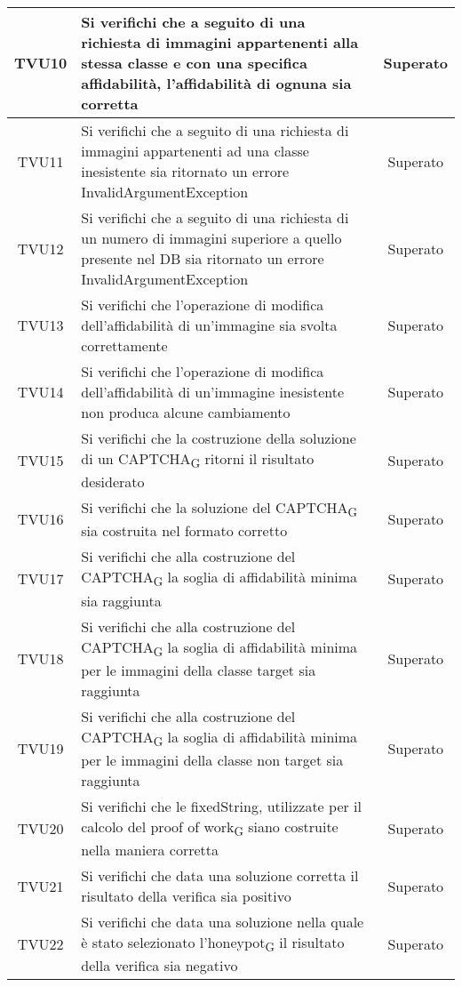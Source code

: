 \begin{center}
\begin{xltabular}{\textwidth}{|c|X|c|}
		\hline
		TVU10 &  Si verifichi che a seguito di una richiesta di immagini appartenenti alla stessa classe e con una specifica affidabilità, l'affidabilità di ognuna sia corretta & Superato\\
		\hline
		TVU11 &  Si verifichi che a seguito di una richiesta di immagini appartenenti ad una classe inesistente sia ritornato un errore InvalidArgumentException & Superato\\
		\hline
		TVU12 &  Si verifichi che a seguito di una richiesta di un numero di immagini superiore a quello presente nel DB sia ritornato un errore InvalidArgumentException & Superato\\
		\hline
		TVU13 &  Si verifichi che l'operazione di modifica dell'affidabilità di un'immagine sia svolta correttamente & Superato\\
		\hline
		TVU14 &  Si verifichi che l'operazione di modifica dell'affidabilità di un'immagine inesistente non produca alcune cambiamento & Superato\\
		\hline
		TVU15 &  Si verifichi che la costruzione della soluzione di un CAPTCHA\textsubscript{G} ritorni il risultato desiderato & Superato\\
		\hline
		TVU16 &  Si verifichi che la soluzione del CAPTCHA\textsubscript{G} sia costruita nel formato corretto & Superato\\
		\hline
		TVU17 &  Si verifichi che alla costruzione del CAPTCHA\textsubscript{G} la soglia di affidabilità minima sia raggiunta & Superato\\
		\hline
		TVU18 &  Si verifichi che alla costruzione del CAPTCHA\textsubscript{G} la soglia di affidabilità minima per le immagini della classe target sia raggiunta & Superato\\
		\hline
		TVU19 &  Si verifichi che alla costruzione del CAPTCHA\textsubscript{G} la soglia di affidabilità minima per le immagini della classe non target sia raggiunta & Superato\\
		\hline
		TVU20 &  Si verifichi che le fixedString, utilizzate per il calcolo del proof of work\textsubscript{G} siano costruite nella maniera corretta & Superato\\
		\hline
		TVU21 & Si verifichi che data una soluzione corretta il risultato della verifica sia positivo  & Superato\\
		\hline
		TVU22 & Si verifichi che data una soluzione nella quale è stato selezionato l'honeypot\textsubscript{G} il risultato della verifica sia negativo  & Superato\\
		\hline

\end{xltabular}
\end{center}
